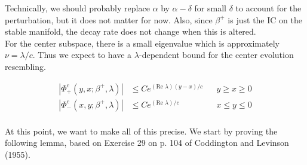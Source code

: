 \documentclass[12pt]{article}
\begin{document}
Technically, we should probably replace $\alpha$ by $\alpha - \delta$ for small $\delta$ to account for the perturbation, but it does not matter for now. Also, since $\beta^+$ is just the IC on the stable manifold, the decay rate does not change when this is altered.\\

For the center subspace, there is a small eigenvalue which is approximately $\nu = \lambda / c$. Thus we expect to have a $\lambda$-dependent bound for the center evolution resembling.

\begin{align*}
|\Phi^c_+(y, x; \beta^+, \lambda)| &\leq C e^{(\text{Re }\lambda)(y-x)/c} && y \geq x \geq 0 \\
|\Phi^c_-(x, y; \beta^+, \lambda)| &\leq C e^{(\text{Re }\lambda)/c} && x \leq y \leq 0 \\
\end{align*}

At this point, we want to make all of this precise. We start by proving the following lemma, based on Exercise 29 on p. 104 of Coddington and Levinson (1955).
\end{document}

